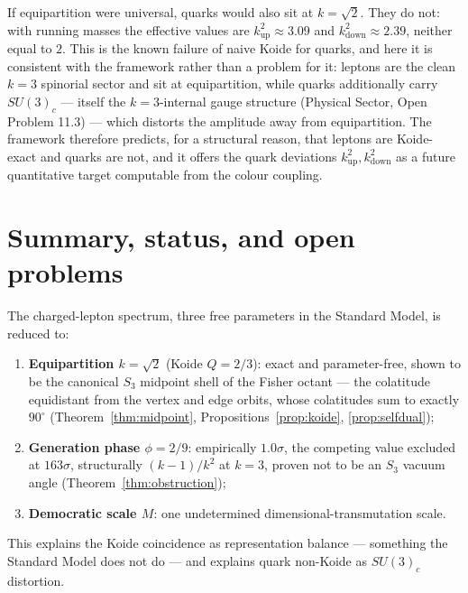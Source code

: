\documentclass[12pt]{article}
\theoremstyle{definition}
\theoremstyle{remark}
\begin{document}
If equipartition were universal, quarks would also sit at $k=\sqrt2$. They do
not: with running masses the effective values are $k^2_{\mathrm{up}}\approx
3.09$ and $k^2_{\mathrm{down}}\approx2.39$, neither equal to $2$. This is the
known failure of naive Koide for quarks, and here it is consistent with the
framework rather than a problem for it: leptons are the clean $k=3$ spinorial
sector and sit at equipartition, while quarks additionally carry $SU(3)_c$ ---
itself the $k=3$-internal gauge structure (Physical Sector, Open Problem
11.3) --- which distorts the amplitude away from equipartition. The framework
therefore predicts, for a structural reason, that leptons are Koide-exact and
quarks are not, and it offers the quark deviations
$k^2_{\mathrm{up}},k^2_{\mathrm{down}}$ as a future quantitative target
computable from the colour coupling.

\section{Summary, status, and open problems}
\label{sec:open}

The charged-lepton spectrum, three free parameters in the Standard Model, is
reduced to:
\begin{enumerate}
\item \textbf{Equipartition $k=\sqrt2$} (Koide $Q=2/3$): exact and
parameter-free, shown to be the canonical $S_3$ midpoint shell of the Fisher
octant --- the colatitude equidistant from the vertex and edge orbits, whose
colatitudes sum to exactly $90^\circ$ (Theorem~\ref{thm:midpoint},
Propositions~\ref{prop:koide}, \ref{prop:selfdual});
\item \textbf{Generation phase $\phi=2/9$}: empirically $1.0\sigma$, the
competing value excluded at $163\sigma$, structurally $(k-1)/k^2$ at $k=3$,
proven not to be an $S_3$ vacuum angle (Theorem~\ref{thm:obstruction});
\item \textbf{Democratic scale $M$}: one undetermined dimensional-transmutation
scale.
\end{enumerate}
This explains the Koide coincidence as representation balance --- something the
Standard Model does not do --- and explains quark non-Koide as $SU(3)_c$
distortion.
\end{document}
